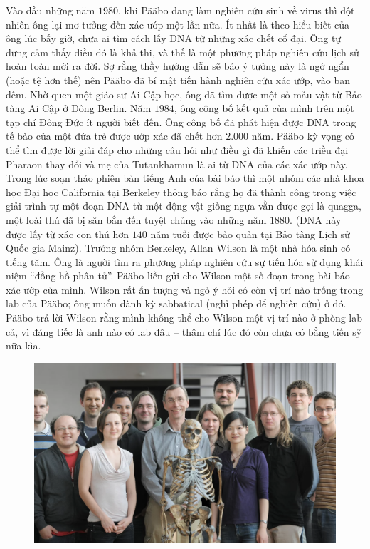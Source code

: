 \begin{multicols}{2}
	\vskip 0.2cm
	\vskip 0.2cm
	Vào đầu những năm $1980$, khi Pääbo đang làm nghiên cứu sinh về virus thì đột nhiên ông lại mơ tưởng đến xác ướp một lần nữa. Ít nhất là theo hiểu biết của ông lúc bấy giờ, chưa ai tìm cách lấy DNA từ những xác chết cổ đại. Ông tự dưng cảm thấy điều đó là khả thi, và thế là một phương pháp nghiên cứu lịch sử hoàn toàn mới ra đời.
	\vskip 0.1cm
	Sợ rằng thầy hướng dẫn sẽ bảo ý tưởng này là ngớ ngẩn (hoặc tệ hơn thế) nên Pääbo đã bí mật tiến hành nghiên cứu xác ướp, vào ban đêm. Nhờ quen một giáo sư Ai Cập học, ông đã tìm được một số mẫu vật từ Bảo tàng Ai Cập ở Đông Berlin. Năm $1984$, ông công bố kết quả của mình trên một tạp chí Đông Đức ít người biết đến. Ông công bố đã phát hiện được DNA trong tế bào của một đứa trẻ được ướp xác đã chết hơn $2{.}000$ năm. Pääbo kỳ vọng có thể tìm được lời giải đáp cho những câu hỏi như điều gì đã khiến các triều đại Pharaon thay đổi và mẹ của Tutankhamun là ai từ DNA của các xác ướp này.
	\vskip 0.1cm
	Trong lúc soạn thảo phiên bản tiếng Anh của bài báo thì một nhóm các nhà khoa học Đại học California tại Berkeley thông báo rằng họ đã thành công trong việc giải trình tự một đoạn DNA từ một động vật giống ngựa vằn được gọi là quagga, một loài thú đã bị săn bắn đến tuyệt chủng vào những năm $1880$. (DNA này được lấy từ xác con thú hơn $140$ năm tuổi được bảo quản tại Bảo tàng Lịch sử Quốc gia Mainz). Trưởng nhóm Berkeley, Allan Wilson là một nhà hóa sinh có tiếng tăm. Ông là người tìm ra phương pháp nghiên cứu sự tiến hóa sử dụng khái niệm “đồng hồ phân tử”. Pääbo liền gửi cho Wilson một số đoạn trong bài báo xác ướp của mình. Wilson rất ấn tượng và ngỏ ý hỏi có còn vị trí nào trống trong lab của Pääbo; ông muốn dành kỳ  sabbatical  (nghỉ phép để nghiên cứu) ở đó. Pääbo trả lời Wilson rằng mình không thể cho Wilson một vị trí nào ở phòng lab cả, vì đáng tiếc là anh nào có lab đâu -- thậm chí lúc đó còn chưa có bằng tiến sỹ nữa kìa.
	\begin{figure}[H]
		\vspace*{-5pt}
		\centering
		\captionsetup{labelformat= empty, justification=centering}
		\includegraphics[width= 1\linewidth]{2}

\end{figure}
\end{multicols}
